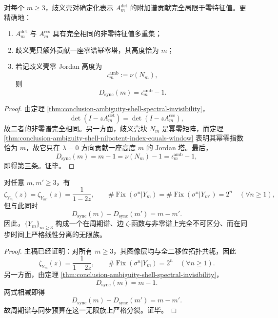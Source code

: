 \begin{theorem}[歧义壳的全部附加谱都被压缩到零特征值扇区]\label{thm:conclusion-ambiguity-shell-zero-sector-only}
对每个 \(m\ge 3\)，歧义壳对确定化表示 \(A_m^{\det}\) 的附加谱贡献完全局限于零特征值。更精确地：
\begin{enumerate}
  \item \(A_m^{\det}\) 与 \(A_m^{\mathrm{ess}}\) 具有完全相同的非零特征值多重集；
  \item 歧义壳只额外贡献一座零谱幂零塔，其高度恰为 \(m\)；
  \item 若记歧义壳零 Jordan 高度为
  \[
  \iota_m^{\mathrm{amb}}:=\nu(N_m),
  \]
  则
  \[
  D_{\mathrm{sync}}(m)=\iota_m^{\mathrm{amb}}-1.
  \]
\end{enumerate}
\end{theorem}
\begin{proof}
由定理 \ref{thm:conclusion-ambiguity-shell-spectral-invisibility}，
\[
\det(I-zA_m^{\det})=\det(I-zA_m^{\mathrm{ess}}),
\]
故二者的非零谱完全相同。另一方面，歧义壳块 \(N_m\) 是幂零矩阵，而定理 \ref{thm:conclusion-ambiguity-shell-nilpotent-index-equals-window} 表明其幂零指数恰为 \(m\)，故它只在 \(\lambda=0\) 方向贡献一座高度 \(m\) 的 Jordan 塔。最后，
\[
D_{\mathrm{sync}}(m)=m-1=\nu(N_m)-1=\iota_m^{\mathrm{amb}}-1,
\]
即得第三条。证毕。
\end{proof}

\begin{theorem}\label{thm:conclusion-zeta-isospectral-sync-linear-separation}
对任意 \(m,m'\ge 3\)，有
\[
\zeta_{Y_m}(z)=\zeta_{Y_{m'}}(z)=\frac1{1-2z},
\qquad
\#\operatorname{Fix}(\sigma^n|Y_m)=\#\operatorname{Fix}(\sigma^n|Y_{m'})=2^n
\quad(\forall n\ge 1),
\]
但与此同时
\[
D_{\mathrm{sync}}(m)-D_{\mathrm{sync}}(m')=m-m'.
\]
因此，\(\{Y_m\}_{m\ge 3}\) 构成一个在周期谱、边 \(\zeta\)-函数与非零谱上完全不可区分、而在同步时间上严格线性分离的无限族。
\end{theorem}
\begin{proof}
主稿已经证明：对所有 \(m\ge 3\)，其图像层均与全二移位拓扑共轭，因此
\[
\zeta_{Y_m}(z)=\frac1{1-2z},
\qquad
\#\operatorname{Fix}(\sigma^n|Y_m)=2^n
\quad(\forall n\ge 1).
\]
另一方面，由定理 \ref{thm:conclusion-ambiguity-shell-spectral-invisibility}，
\[
D_{\mathrm{sync}}(m)=m-1.
\]
两式相减即得
\[
D_{\mathrm{sync}}(m)-D_{\mathrm{sync}}(m')=m-m'.
\]
故周期谱与同步预算在这一无限族上严格分裂。证毕。
\end{proof}

